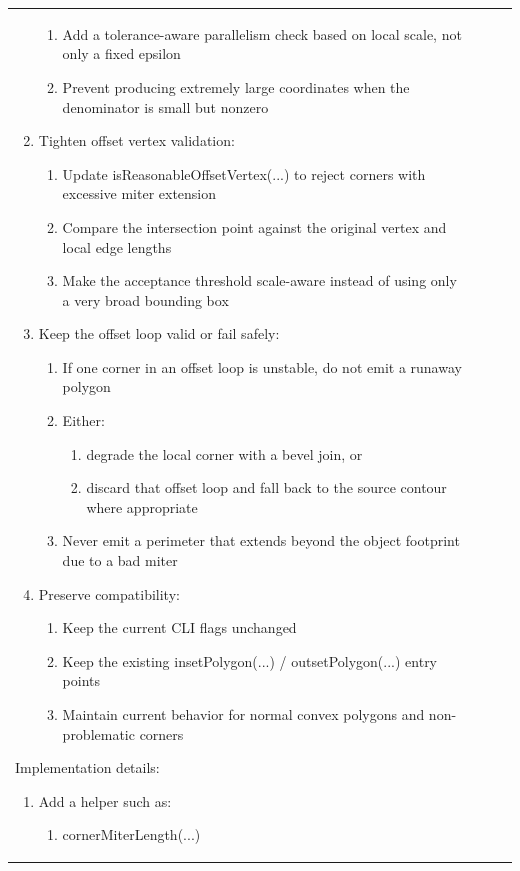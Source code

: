 \documentclass[10pt,twocolumn,a4paper]{article}
\begin{document}
\begin{longtable}{@{}p{0.6cm}p{1.5cm}p{11.0cm}p{2.7cm}@{}}
\begin{enumerate}
\begin{enumerate}
		\item{Add a tolerance-aware parallelism check based on local scale, not only a fixed epsilon}
		\item{Prevent producing extremely large coordinates when the denominator is small but nonzero}
	\end{enumerate}
	\item{Tighten offset vertex validation:}
	\begin{enumerate}
		\item{Update isReasonableOffsetVertex(...) to reject corners with excessive miter extension}
		\item{Compare the intersection point against the original vertex and local edge lengths}
		\item{Make the acceptance threshold scale-aware instead of using only a very broad bounding box}
	\end{enumerate}
	\item{Keep the offset loop valid or fail safely:}
	\begin{enumerate}
		\item{If one corner in an offset loop is unstable, do not emit a runaway polygon}
		\item{Either:}
		\begin{enumerate}
			\item{degrade the local corner with a bevel join, or}
			\item{discard that offset loop and fall back to the source contour where appropriate} 
		\end{enumerate}
		\item{Never emit a perimeter that extends beyond the object footprint due to a bad miter}
	\end{enumerate}
	\item{Preserve compatibility:}
	\begin{enumerate}
		\item{Keep the current CLI flags unchanged}
		\item{Keep the existing insetPolygon(...) / outsetPolygon(...) entry points}
		\item{Maintain current behavior for normal convex polygons and non-problematic corners}
	\end{enumerate}
\end{enumerate}
Implementation details:	
\begin{enumerate}
	\item{Add a helper such as:}
	\begin{enumerate}
		\item{cornerMiterLength(...)}

\end{enumerate}
\end{enumerate}
\end{longtable}
\end{document}
